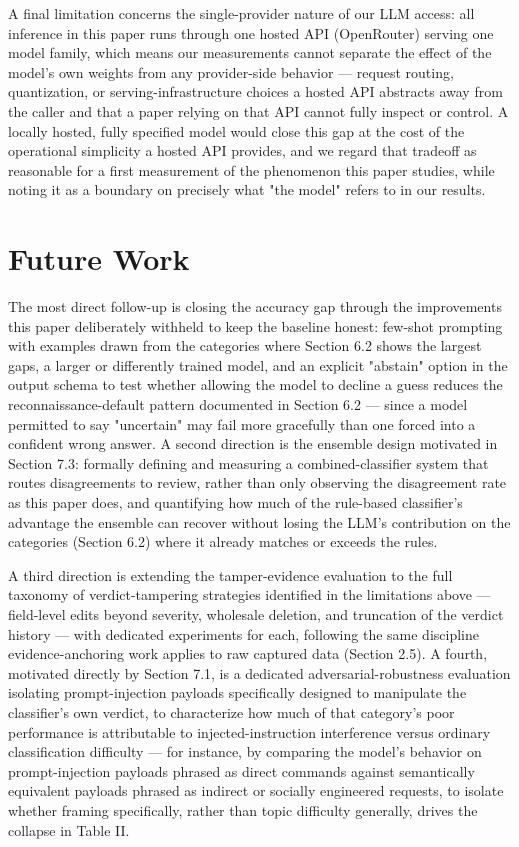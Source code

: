 \documentclass[journal,10pt,twocolumn]{IEEEtran}
\begin{document}
A final limitation concerns the single-provider nature of our LLM access: all inference in this paper runs through one hosted API (OpenRouter) serving one model family, which means our measurements cannot separate the effect of the model's own weights from any provider-side behavior --- request routing, quantization, or serving-infrastructure choices a hosted API abstracts away from the caller and that a paper relying on that API cannot fully inspect or control. A locally hosted, fully specified model would close this gap at the cost of the operational simplicity a hosted API provides, and we regard that tradeoff as reasonable for a first measurement of the phenomenon this paper studies, while noting it as a boundary on precisely what "the model" refers to in our results.

\section{Future Work}

The most direct follow-up is closing the accuracy gap through the improvements this paper deliberately withheld to keep the baseline honest: few-shot prompting with examples drawn from the categories where Section 6.2 shows the largest gaps, a larger or differently trained model, and an explicit "abstain" option in the output schema to test whether allowing the model to decline a guess reduces the reconnaissance-default pattern documented in Section 6.2 --- since a model permitted to say "uncertain" may fail more gracefully than one forced into a confident wrong answer. A second direction is the ensemble design motivated in Section 7.3: formally defining and measuring a combined-classifier system that routes disagreements to review, rather than only observing the disagreement rate as this paper does, and quantifying how much of the rule-based classifier's advantage the ensemble can recover without losing the LLM's contribution on the categories (Section 6.2) where it already matches or exceeds the rules.

A third direction is extending the tamper-evidence evaluation to the full taxonomy of verdict-tampering strategies identified in the limitations above --- field-level edits beyond severity, wholesale deletion, and truncation of the verdict history --- with dedicated experiments for each, following the same discipline evidence-anchoring work applies to raw captured data (Section 2.5). A fourth, motivated directly by Section 7.1, is a dedicated adversarial-robustness evaluation isolating prompt-injection payloads specifically designed to manipulate the classifier's own verdict, to characterize how much of that category's poor performance is attributable to injected-instruction interference versus ordinary classification difficulty --- for instance, by comparing the model's behavior on prompt-injection payloads phrased as direct commands against semantically equivalent payloads phrased as indirect or socially engineered requests, to isolate whether framing specifically, rather than topic difficulty generally, drives the collapse in Table II.
\end{document}
